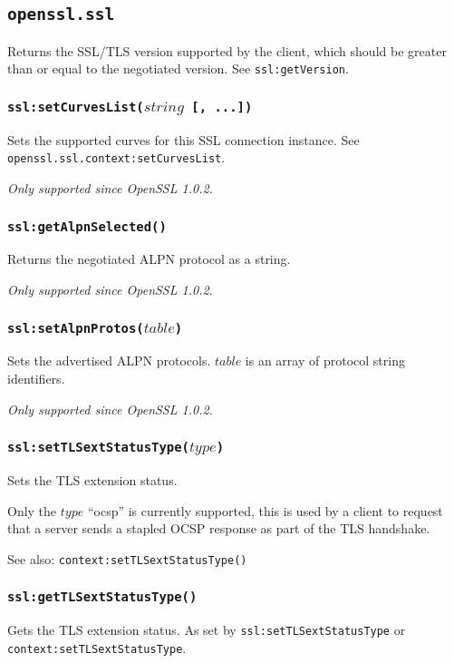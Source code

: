 \documentclass[11pt, oneside]{memoir}
\newcommand*{\fn}[1]{\texttt{#1}\xspace}
\newcounter{toccols}
\newenvironment{Module}[1]{
	\subsection{\texttt{#1}}
	\addtocontents{toc}{
		\protect\begin{multicols}{\value{toccols}}
	}
}{
	\addtocontents{toc}{\protect\end{multicols}}
}
\begin{document}
\begin{Module}{openssl.ssl}
Returns the SSL/TLS version supported by the client, which should be greater than or equal to the negotiated version. See \fn{ssl:getVersion}.

\subsubsection[\fn{ssl:setCurvesList}]{\fn{ssl:setCurvesList($string$ [, ...])}}

Sets the supported curves for this SSL connection instance. See \fn{openssl.ssl.context:setCurvesList}.

\emph{Only supported since OpenSSL 1.0.2.}

\subsubsection[\fn{ssl:getAlpnSelected}]{\fn{ssl:getAlpnSelected()}}

Returns the negotiated ALPN protocol as a string.

\emph{Only supported since OpenSSL 1.0.2.}

\subsubsection[\fn{ssl:setAlpnProtos}]{\fn{ssl:setAlpnProtos($table$)}}

Sets the advertised ALPN protocols. $table$ is an array of protocol string identifiers.

\emph{Only supported since OpenSSL 1.0.2.}

\subsubsection[\fn{ssl:setTLSextStatusType}]{\fn{ssl:setTLSextStatusType($type$)}}

Sets the TLS extension status.

Only the $type$ ``ocsp'' is currently supported, this is used by a client to request that a server sends a stapled OCSP response as part of the TLS handshake.

See also: \fn{context:setTLSextStatusType()}

\subsubsection[\fn{ssl:getTLSextStatusType}]{\fn{ssl:getTLSextStatusType()}}

Gets the TLS extension status. As set by \fn{ssl:setTLSextStatusType} or \fn{context:setTLSextStatusType}.


\end{Module}
\end{document}
